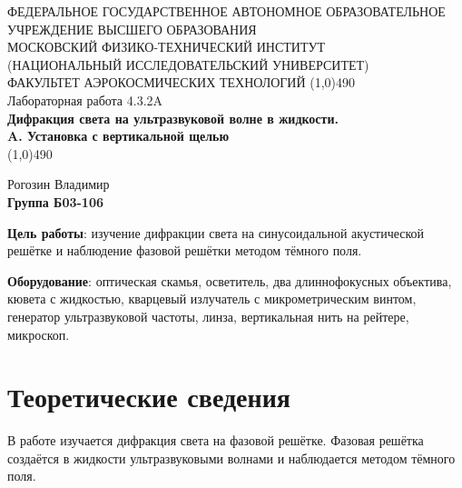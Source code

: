 \documentclass[a4paper,12pt]{article}
\begin{document}
\begin{titlepage}
\begin{center}
\large{\small ФЕДЕРАЛЬНОЕ ГОСУДАРСТВЕННОЕ АВТОНОМНОЕ ОБРАЗОВАТЕЛЬНОЕ\\ УЧРЕЖДЕНИЕ ВЫСШЕГО ОБРАЗОВАНИЯ \\ МОСКОВСКИЙ ФИЗИКО-ТЕХНИЧЕСКИЙ ИНСТИТУТ\\ (НАЦИОНАЛЬНЫЙ ИССЛЕДОВАТЕЛЬСКИЙ УНИВЕРСИТЕТ)\\ ФАКУЛЬТЕТ АЭРОКОСМИЧЕСКИХ ТЕХНОЛОГИЙ}
\vfill
\line(1,0){490}\\[1mm]
\huge{Лабораторная работа 4.3.2A}\\
\huge\textbf{Дифракция света на ультразвуковой волне в жидкости. \\
            A. Установка с вертикальной щелью}\\
\line(1,0){490}\\[1mm]
\vfill
\begin{flushright}
\normalsize{Рогозин Владимир}\\
\normalsize{\textbf{Группа Б03-106}}\\
\end{flushright}
\end{center}
\end{titlepage}

\textbf{Цель работы}:
изучение дифракции света на синусоидальной акустической решётке и наблюдение фазовой решётки методом тёмного поля.

\textbf{Оборудование}:
оптическая скамья, осветитель, два длиннофокусных объектива, кювета с жидкостью, кварцевый излучатель с микрометрическим винтом, генератор ультразвуковой частоты, линза, вертикальная нить на рейтере, микроскоп.

\section{Теоретические сведения}
В работе изучается дифракция света на фазовой решётке. Фазовая решётка создаётся в жидкости ультразвуковыми волнами и наблюдается методом тёмного поля.
\end{document}
